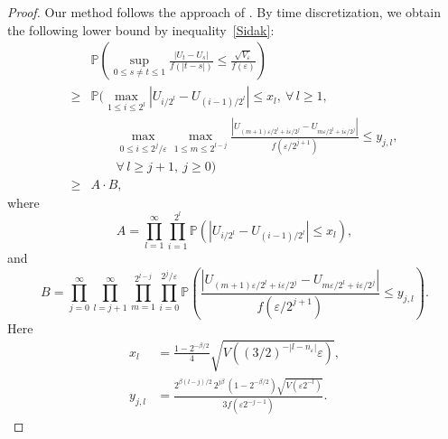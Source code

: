 \documentclass[preprint,12pt]{elsarticle}
\theoremstyle{definition}  %
\theoremstyle{plain}  %
\begin{document}
\begin{proof}
Our method follows the approach of \cite{KuelbsLiShao1995}. 
By time discretization, we obtain the following lower bound by inequality~\eqref{Sidak}:
\begin{align*} 
&\mathbb{P}\!\left( 
   \sup_{0 \leq s \neq t \leq 1} 
   \frac{|U_t - U_s|}{f(|t-s|)} 
   \leq \frac{\sqrt{V_\varepsilon}}{f(\varepsilon)} 
 \right) \\
 \geq & \mathbb{P}\Biggl(
   \max_{1 \leq i \leq 2^l} 
   |U_{i/2^l} - U_{(i-1)/2^l}| \leq x_l, \ \forall\, l \geq 1, \\
&\qquad  
   \max_{0 \leq i \leq 2^j/\varepsilon}
   \max_{1 \leq m \leq 2^{l-j}}
   \frac{|U_{(m+1)\varepsilon/2^l + i\varepsilon/2^j} 
          - U_{m\varepsilon/2^l + i\varepsilon/2^j}|}
        {f(\varepsilon/2^{j+1})} 
   \leq y_{j,l},  \\ 
  &\qquad \forall\, l \geq j+1,\ j \geq 0 
 \Biggr) \\
 \geq & A \cdot B, 
\end{align*} 
where 
\begin{equation*} 
A = \prod_{l=1}^\infty \prod_{i=1}^{2^l} 
    \mathbb{P}\!\left(
      |U_{i/2^l} - U_{(i-1)/2^l}| \leq x_l
    \right), 
\end{equation*} 
and 
\begin{equation*} 
B = \prod_{j=0}^\infty 
    \prod_{l=j+1}^\infty 
    \prod_{m=1}^{2^{l-j}} 
    \prod_{i=0}^{2^j/\varepsilon} 
    \mathbb{P}\!\left(
      \frac{|U_{(m+1)\varepsilon/2^l + i\varepsilon/2^j} 
             - U_{m\varepsilon/2^l + i\varepsilon/2^j}|}
           {f(\varepsilon/2^{j+1})} 
      \leq y_{j,l}
    \right). 
\end{equation*}  
Here 
\begin{align*} 
x_l &= \frac{1 - 2^{-\beta/2}}{4} 
       \sqrt{V\!\left( (3/2)^{-|l-n_\varepsilon|}\varepsilon \right)}, \\ 
y_{j,l} &= \frac{2^{\beta(l-j)/2} \, 2^{j\beta} \, (1 - 2^{-\beta/2}) 
          \sqrt{V(\varepsilon 2^{-l})}}
         {3 f(\varepsilon 2^{-j-1})}. 
\end{align*} 


\end{proof}
\end{document}

